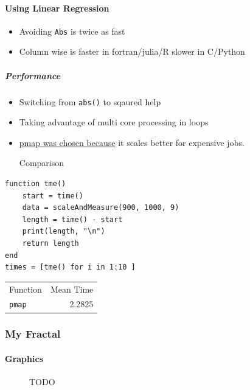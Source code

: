 \documentclass[11pt]{article}
\begin{document}
\paragraph{Using Linear Regression}
\label{sec:org5d47cf2}
\begin{itemize}
\item Avoiding \texttt{Abs} is twice as fast
\item Column wise is faster in fortran/julia/R slower in C/Python
\end{itemize}
\subparagraph{Performance}
\label{sec:org4f2126c}
\begin{itemize}
\item Switching from \texttt{abs()} to sqaured help
\item Taking advantage of multi core processing in loops

\item \href{https://stackoverflow.com/a/55704326/12843551}{pmap was chosen because} it scales better for expensive jobs.

Comparison
\end{itemize}
\lstset{language=julia,label= ,caption= ,captionpos=b,numbers=none}
\begin{lstlisting}
function tme()
    start = time()
    data = scaleAndMeasure(900, 1000, 9)
    length = time() - start
    print(length, "\n")
    return length
end
times = [tme() for i in 1:10 ]
\end{lstlisting}

\begin{center}
\begin{tabular}{lr}
Function & Mean Time\\
\texttt{pmap} & 2.2825\\
\end{tabular}
\end{center}
\subsubsection{My Fractal}
\label{sec:org0232e56}
\paragraph{Graphics}
\label{sec:org5a32a90}

\begin{figure}[htbp]
\centering

\caption{\label{My-Frac-GR}TODO}
\end{figure}
\end{document}
